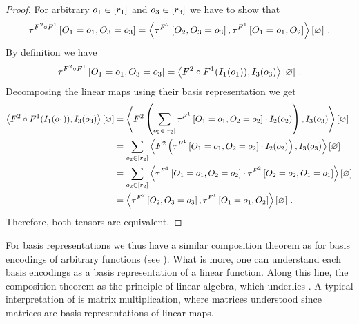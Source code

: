 \begin{proof}
    For arbitrary $o_{1}\in[r_{1}]$ and $o_{3}\in[r_{3}]$ we have to show that
    \begin{align*}
        \tau^{F^{2}\circ F^{1}}\left[O_{1}=o_{1},O_{3}=o_{3}\right]
        = \left\langle 
            \tau^{F^{2}}\left[O_{2},O_{3}=o_{3}\right],\tau^{F^{1}}\left[O_{1}=o_{1},O_{2}\right]
        \right\rangle \left[ \varnothing \right] \, .
    \end{align*}
    By definition we have
    \begin{align*}
        \tau^{F^{2}\circ F^{1}}\left[O_{1}=o_{1},O_{3}=o_{3}\right]
        = \left\langle F^{2}\circ F^{1}(I_{1}(o_{1})),I_{3}(o_{3})\right\rangle \left[ \varnothing \right] \, .
    \end{align*}
    Decomposing the linear maps using their basis representation we get
    \begin{align*}
        \left\langle F^{2}\circ F^{1}(I_{1}(o_{1})),I_{3}(o_{3})\right\rangle \left[ \varnothing \right]
        &= \left\langle F^{2}\left(\sum_{o_{2}\in[r_{2}]} \tau^{F^{1}}\left[O_{1}=o_{1},O_{2}=o_{2}\right] \cdot I_{2}(o_{2})\right),I_{3}(o_{3})\right\rangle \left[ \varnothing \right] \\
        &= \sum_{o_{2}\in[r_{2}]} \left\langle F^{2}\left(\tau^{F^{1}}\left[O_{1}=o_{1},O_{2}=o_{2}\right] \cdot I_{2}(o_{2})\right),I_{3}(o_{3})\right\rangle \left[ \varnothing \right] \\
        &= \sum_{o_{2}\in[r_{2}]} \left\langle \tau^{F^{1}}\left[O_{1}=o_{1},O_{2}=o_{2}\right] \cdot \tau^{F^{2}}\left[O_{2}=o_{2},O_{1}=o_{1}\right]\right\rangle \left[ \varnothing \right] \\
        &= \left\langle 
            \tau^{F^{2}}\left[O_{2},O_{3}=o_{3}\right],\tau^{F^{1}}\left[O_{1}=o_{1},O_{2}\right]
        \right\rangle \left[ \varnothing \right] \, .
    \end{align*}
    Therefore, both tensors are equivalent.
\end{proof}

For basis representations we thus have a similar composition theorem as for basis encodings of arbitrary functions (see ).
What is more, one can understand each basis encodings as a basis representation of a linear function.
Along this line, the composition theorem  as the principle of linear algebra, which underlies .
A typical interpretation of  is matrix multiplication, where matrices understood since matrices are basis representations of linear maps.

